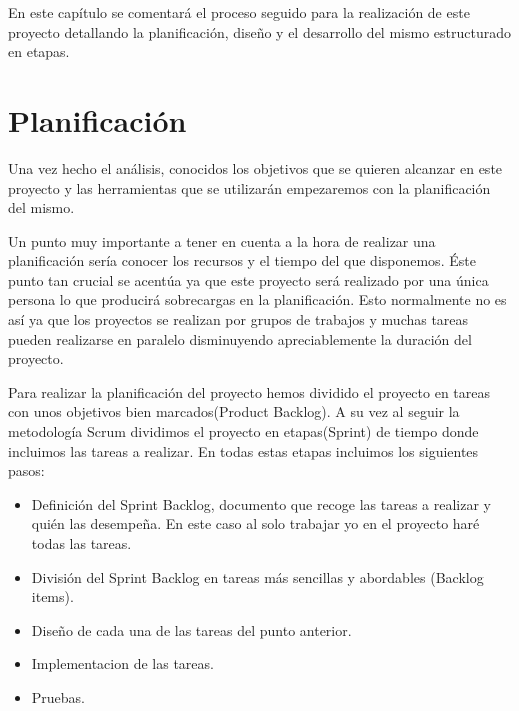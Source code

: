 

 En este capítulo se comentará el proceso seguido para la realización de este proyecto detallando la planificación, diseño y el desarrollo del mismo estructurado en etapas.
 
\section{Planificación}

Una vez hecho el análisis, conocidos los objetivos que se quieren alcanzar en este proyecto y las herramientas que se utilizarán  empezaremos con la planificación del mismo.

Un punto muy  importante a tener en cuenta a la hora de realizar una planificación sería conocer los recursos y el tiempo del que disponemos.
Éste punto tan crucial se acentúa ya que este proyecto será realizado por una única persona lo que producirá sobrecargas en la planificación. Esto normalmente no es así ya que los proyectos se realizan por grupos de trabajos y muchas tareas pueden realizarse en paralelo disminuyendo apreciablemente la duración del proyecto.

Para realizar la planificación del proyecto hemos dividido el proyecto en tareas con unos objetivos bien marcados(Product Backlog). A su vez al seguir la metodología Scrum dividimos el proyecto en etapas(Sprint) de tiempo donde incluimos las tareas a realizar.
 En todas estas etapas incluimos los siguientes pasos:
 
 


\begin{itemize}
\item Definición del Sprint Backlog,  documento que recoge las tareas a realizar y quién las desempeña. En este caso al solo trabajar yo en el proyecto haré todas las tareas.


\item División del Sprint Backlog en tareas más sencillas y abordables (Backlog items). 



\item Diseño de cada una de las tareas del punto anterior.
\item  Implementacion de las tareas.
\item Pruebas.
\end{itemize}



